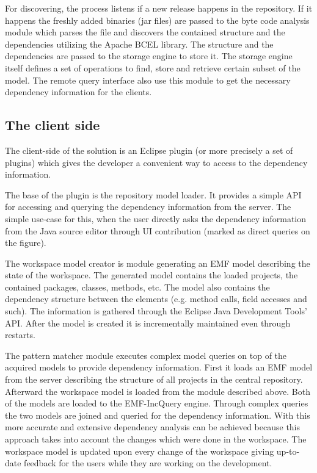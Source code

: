 For discovering, the process listens if a new release happens in the repository.
If it happens the freshly added binaries (jar files) are passed to the byte code
analysis module which parses the file and discovers the contained structure and
the dependencies utilizing the Apache BCEL library.  The structure and the
dependencies are passed to the storage engine to store it. The storage engine
itself defines a set of operations to find, store and retrieve certain subset of
the model. The remote query interface also use this module to get the necessary 
dependency information for the clients.


\subsection{The client side}
The client-side of the solution is an Eclipse plugin (or more precisely a set of
plugins) which gives the developer a convenient way to access to the dependency
information.

The base of the plugin is the repository model loader. It provides a simple API
for accessing and querying the dependency information from the server. The
simple use-case for this, when the user directly asks the dependency information
from the Java source editor through UI contribution (marked as direct queries on
the figure).

The workspace model creator is module generating an EMF model describing the
state of the workspace. The generated model contains the loaded projects, the
contained packages, classes, methods, etc. The model also contains the
dependency structure between the elements (e.g. method calls, field accesses and
such). The information is gathered through the Eclipse Java Development Tools'
API. After the model is created it is incrementally maintained even through 
restarts.

The pattern matcher module executes complex model queries on top of the acquired
models to provide dependency information. First it loads an EMF model from the
server describing the structure of all projects in the central repository.
Afterward the workspace model is loaded from the module described above. Both of
the models are loaded to the EMF-IncQuery engine. Through complex queries the two
models are joined and queried for the dependency information. With this more 
accurate and extensive dependency analysis can be achieved because this approach
takes into account the changes which were done in the workspace. The workspace 
model is updated upon every change of the workspace giving up-to-date feedback 
for the users while they are working on the development. 

